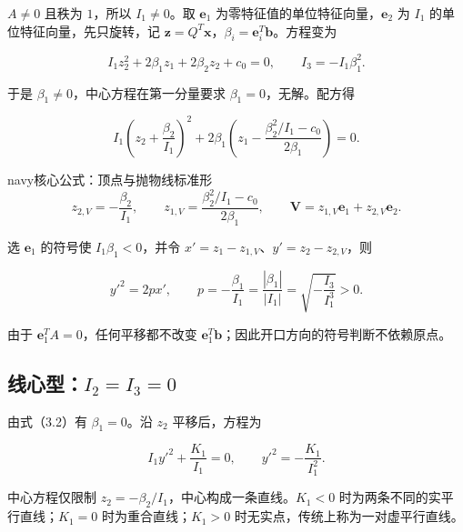 \documentclass[11pt,a4paper]{article}
\begin{document}
\(A\ne0\) 且秩为 \(1\)，所以 \(I_1\ne0\)。取 \(\boldsymbol e_1\)
为零特征值的单位特征向量，\(\boldsymbol e_2\) 为 \(I_1\)
的单位特征向量，先只旋转，记
\(\boldsymbol z=Q^T\boldsymbol x\)，\(\beta_i=\boldsymbol e_i^T\boldsymbol b\)。方程变为

\begin{equation*}
I_1z_2^2+2\beta_1z_1+2\beta_2z_2+c_0=0,\qquad I_3=-I_1\beta_1^2.\tag{3.2}
\end{equation*}

于是 \(\beta_1\ne0\)，中心方程在第一分量要求 \(\beta_1=0\)，无解。配方得

\begin{equation*}
I_1\left(z_2+\frac{\beta_2}{I_1}\right)^2+2\beta_1\left(z_1-\frac{\beta_2^2/I_1-c_0}{2\beta_1}\right)=0.
\end{equation*}

\begin{sboxenv}{navy}{核心公式：顶点与抛物线标准形}
\begin{equation*}
z_{2,V}=-\frac{\beta_2}{I_1},\qquad z_{1,V}=\frac{\beta_2^2/I_1-c_0}{2\beta_1},\qquad \boldsymbol V=z_{1,V}\boldsymbol e_1+z_{2,V}\boldsymbol e_2.\tag{3.3}
\end{equation*}

选 \(\boldsymbol e_1\) 的符号使 \(I_1\beta_1<0\)，并令
\(x'=z_1-z_{1,V}\)、\(y'=z_2-z_{2,V}\)，则

\begin{equation*}
y'^2=2px',\qquad p=-\frac{\beta_1}{I_1}=\frac{|\beta_1|}{|I_1|}=\sqrt{-\frac{I_3}{I_1^3}}>0.\tag{3.4}
\end{equation*}

\end{sboxenv}

由于 \(\boldsymbol e_1^TA=0\)，任何平移都不改变
\(\boldsymbol e_1^T\boldsymbol b\)；因此开口方向的符号判断不依赖原点。

\subsection{\texorpdfstring{线心型：\(I_2=I_3=0\)}{线心型：I\_2=I\_3=0}}\label{ux7ebfux5fc3ux578bi_2i_30}

由式（3.2）有 \(\beta_1=0\)。沿 \(z_2\) 平移后，方程为

\begin{equation*}
I_1y'^2+\frac{K_1}{I_1}=0,\qquad y'^2=-\frac{K_1}{I_1^2}.\tag{3.5}
\end{equation*}

中心方程仅限制 \(z_2=-\beta_2/I_1\)，中心构成一条直线。\(K_1<0\)
时为两条不同的实平行直线；\(K_1=0\) 时为重合直线；\(K_1>0\)
时无实点，传统上称为一对虚平行直线。
\end{document}
